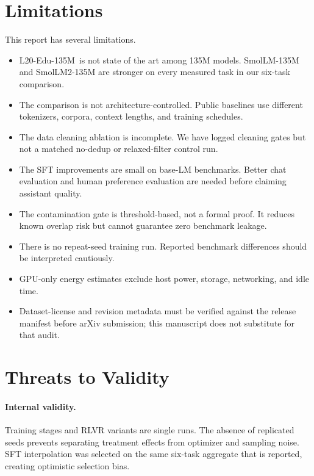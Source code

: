\documentclass[11pt]{article}
\newcommand{\model}{L20-Edu-135M}
\begin{document}
\section{Limitations}

This report has several limitations.

\begin{itemize}
  \item \model\ is not state of the art among 135M models. SmolLM-135M and SmolLM2-135M are stronger on every measured task in our six-task comparison.
  \item The comparison is not architecture-controlled. Public baselines use different tokenizers, corpora, context lengths, and training schedules.
  \item The data cleaning ablation is incomplete. We have logged cleaning gates but not a matched no-dedup or relaxed-filter control run.
  \item The SFT improvements are small on base-LM benchmarks. Better chat evaluation and human preference evaluation are needed before claiming assistant quality.
  \item The contamination gate is threshold-based, not a formal proof. It reduces known overlap risk but cannot guarantee zero benchmark leakage.
  \item There is no repeat-seed training run. Reported benchmark differences should be interpreted cautiously.
  \item GPU-only energy estimates exclude host power, storage, networking, and idle time.
  \item Dataset-license and revision metadata must be verified against the release manifest before arXiv submission; this manuscript does not substitute for that audit.
\end{itemize}

\section{Threats to Validity}

\paragraph{Internal validity.}
Training stages and RLVR variants are single runs. The absence of replicated seeds prevents separating treatment effects from optimizer and sampling noise. SFT interpolation was selected on the same six-task aggregate that is reported, creating optimistic selection bias.
\end{document}
